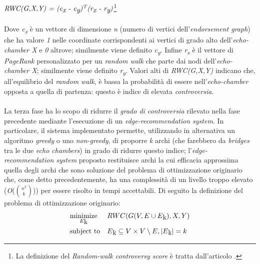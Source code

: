 \\\\
$\textit{RWC(G,X,Y) = (c\textsubscript{x} - c\textsubscript{y})\textsuperscript{T}(r\textsubscript{x} - r\textsubscript{y})}$\footnote{La definizione del \textit{Random-walk controversy score} è tratta dall'articolo \cite{garimella:paper}.}
\\\\Dove \textit{c\textsubscript{x}} è un vettore di dimensione \textit{n} (numero di vertici dell'\textit{endorsement graph}) che ha valore \textit{1} nelle coordinate corrispondenti ai vertici di grado alto dell'\textit{echo-chamber X} e \textit{0} altrove; similmente viene definito \textit{c\textsubscript{y}}. Infine \textit{r\textsubscript{x}} è il vettore di \textit{PageRank} personalizzato per un \textit{random walk} che parte dai nodi dell'\textit{echo-chamber X}; similmente viene definito \textit{r\textsubscript{y}}. Valori alti di \textit{RWC(G,X,Y)} indicano che, all'equilibrio del \textit{random walk}, è bassa la probabilità di essere nell'\textit{echo-chamber} opposta a quella di partenza: questo è indice di elevata \textit{controversia}. 
\\\\La terza fase ha lo scopo di ridurre il \textit{grado di controversia} rilevato nella fase precedente mediante l'esecuzione di un \textit{edge-recommendation system}. In particolare, il sistema implementato permette, utilizzando in alternativa un algoritmo \textit{greedy} o uno \textit{non-greedy}, di proporre \textit{k} archi (che farebbero da \textit{bridges} tra le due \textit{echo chambers}) in grado di ridurre questo indice; l'\textit{edge-recommendation system} proposto restituisce archi la cui efficacia approssima quella degli archi che sono soluzione del problema di ottimizzazione originario che, come detto precedentemente, ha una complessità di un livello troppo elevato (\textit{O}(${n^2\choose k}$)) per essere risolto in tempi accettabili. Di seguito la definizione del problema di ottimizzazione originario:
\\
\begin{equation*}
\begin{aligned}
& \underset{E\textsubscript{k}}{\text{minimize}}
& & RWC(G(V, E \cup E\textsubscript{k}),X,Y) \\
& \text{subject to}
& & E\textsubscript{k} \subseteq V \times V \setminus E, \left|{E\textsubscript{k}}\right| = k
\end{aligned}
\end{equation*}
